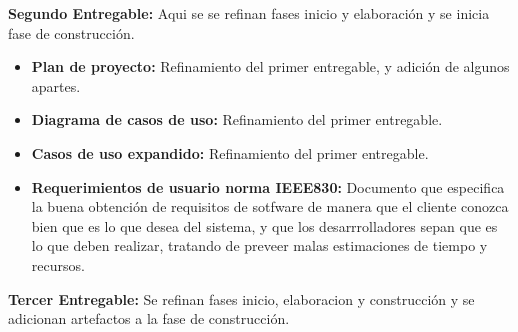 \documentclass[]{article}
\begin{document}
                \textbf{Segundo Entregable:} Aqui se se refinan fases inicio y elaboración y se
                inicia fase de construcción.
                
                \begin{itemize}
                \item\textbf{Plan de proyecto:} Refinamiento del primer entregable, y adición de
                algunos apartes.
                \item\textbf{Diagrama de casos de uso:} Refinamiento del primer entregable.
                \item\textbf{Casos de uso expandido:} Refinamiento del primer entregable.
                \item\textbf{Requerimientos de usuario norma IEEE830:} Documento que especifica la
                buena obtención de requisitos de sotfware de manera que el cliente conozca bien que
                es lo que desea del sistema, y que los desarrrolladores sepan que es lo que deben
                realizar, tratando de preveer malas estimaciones de tiempo y recursos.
                \end{itemize}
                
                \textbf{Tercer Entregable:} Se refinan fases inicio, elaboracion y construcción y
                se adicionan artefactos a la fase de construcción.
                
\end{document}
